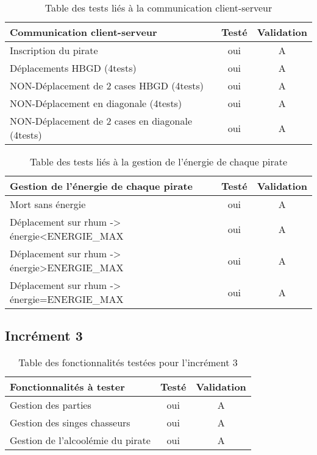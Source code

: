 \begin{table}[!h]
\begin{center}
\begin{tabular}{|p{10cm}|c|c|}
\hline
\textbf{Communication client-serveur} & \textbf{Testé} & \textbf{Validation} \\\hline
Inscription du pirate							& oui & A \\\hline
Déplacements HBGD (4tests)						& oui & A \\\hline
NON-Déplacement de 2 cases HBGD (4tests)		& oui & A \\\hline
NON-Déplacement en diagonale (4tests)			& oui & A \\\hline
NON-Déplacement de 2 cases en diagonale (4tests) & oui & A \\\hline
\end{tabular}
\end{center}
\caption{Table des tests liés à la communication client-serveur}
\end{table}

\begin{table}[!h]
\begin{center}
\begin{tabular}{|p{10cm}|c|c|}
\hline
\textbf{Gestion de l’énergie de chaque pirate} & \textbf{Testé} & \textbf{Validation} \\\hline
Mort sans énergie & oui & A \\\hline
Déplacement sur rhum -> énergie<ENERGIE\_MAX	& oui & A \\\hline
Déplacement sur rhum -> énergie>ENERGIE\_MAX	& oui & A \\\hline
Déplacement sur rhum -> énergie=ENERGIE\_MAX	& oui & A \\\hline
\end{tabular}
\end{center}
\caption{Table des tests liés à la gestion de l’énergie de chaque pirate}
\end{table}

\newpage
	\subsection{Incrément 3}
\begin{table}[!h]
\begin{center}		
\begin{tabular}{|p{10cm}|c|c|}%
\hline
\textbf{Fonctionnalités à tester} & \textbf{Testé} & \textbf{Validation} \\\hline
Gestion des parties					& oui & A \\\hline
Gestion des singes chasseurs		& oui & A \\\hline
Gestion de l’alcoolémie du pirate	& oui & A \\\hline
\end{tabular}
\end{center}
\caption{Table des fonctionnalités testées pour l'incrément 3}
\end{table}

